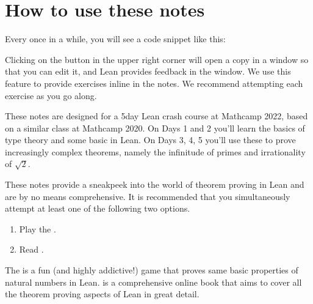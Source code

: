 \documentclass[letterpaper,10pt,english]{sphinxmanual}
\begin{document}
\section{How to use these notes}
\label{\detokenize{introduction:how-to-use-these-notes}}
\sphinxAtStartPar
Every once in a while, you will see a code snippet like this:

\begin{sphinxVerbatim}[commandchars=\\\{\}]
 
\end{sphinxVerbatim}

\sphinxAtStartPar
Clicking on the  button in the upper right corner will
open a copy in a window
so that you can edit it,
and Lean provides feedback in the  window.
We use this feature to provide exercises inline in the notes.
We recommend attempting each exercise as you go along.

\sphinxAtStartPar
These notes are designed for a 5\sphinxhyphen{}day Lean crash course at Mathcamp 2022, based on a similar class at Mathcamp 2020.
On Days 1 and 2 you’ll learn the basics of type theory and some basic  in Lean.
On Days 3, 4, 5 you’ll use these to prove increasingly complex theorems, namely the infinitude of primes and irrationality of \(\sqrt{2}\).

\sphinxAtStartPar
These notes provide a sneak\sphinxhyphen{}peek into the world of theorem proving in Lean and are by no means comprehensive.
It is recommended that you simultaneously attempt at least one of the following two options.
\begin{enumerate}
%
\item {} 
\sphinxAtStartPar
Play the .

\item {} 
\sphinxAtStartPar
Read .

\end{enumerate}

\sphinxAtStartPar
The  is a fun (and highly addictive!) game that proves same basic properties of natural numbers in Lean.
 is a comprehensive online book that aims to cover all the theorem proving aspects of Lean in great detail.
\end{document}
